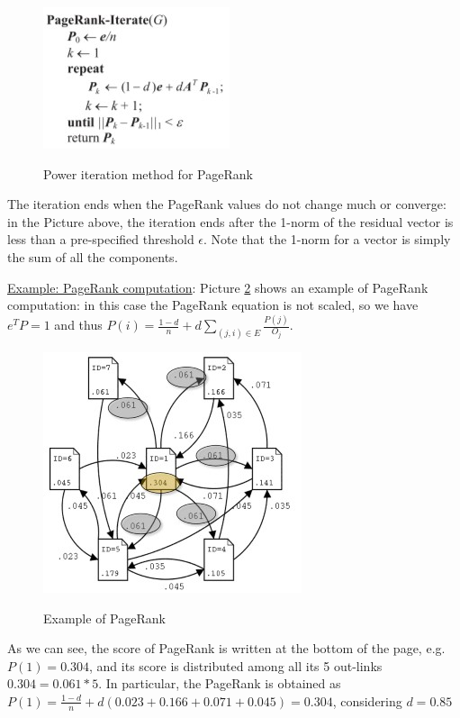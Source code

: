 \begin{figure}[h!]
		\centering
        \includegraphics[scale = 1.8]{img/power iteration method.jpg}
		\label{pi}
        \caption{Power iteration method for PageRank}
\end{figure}

The iteration ends when the PageRank values do not change much or converge: in the Picture above, the iteration ends after the 1-norm of the residual vector is less than a pre-specified threshold $\epsilon$. Note that the 1-norm for a vector is simply the sum of all the components.

\underline{Example: PageRank computation}: Picture \ref{ex:page rank} shows an example of PageRank computation: in this case the PageRank equation is not scaled, so we have $e^TP = 1$ and thus $P(i) = \frac{1-d}{n} + d \sum_{(j,i) \in E} \frac{P(j)}{O_j}$.

\begin{figure}[h!]
		\centering
        \includegraphics[scale = 1.8]{img/Example page rank.jpg}
		\label{ex:page rank}
        \caption{Example of PageRank}
\end{figure}

As we can see, the score of PageRank is written at the bottom of the page, e.g. $P(1) = 0.304$, and its score is distributed among all its 5 out-links $0.304 = 0.061 * 5$. In particular, the PageRank is obtained as $P(1) = \frac{1-d}{n} + d (0.023 + 0.166 + 0.071 + 0.045) = 0.304$, considering $d = 0.85$

